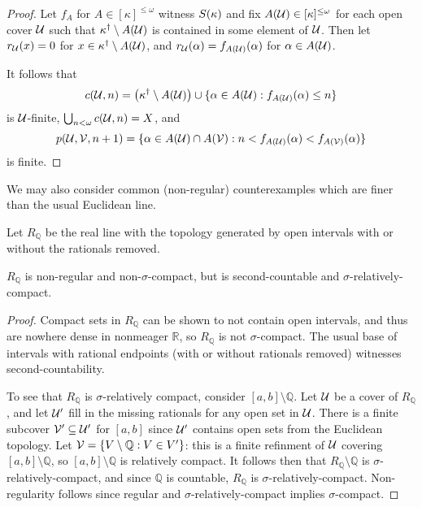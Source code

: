 \begin{proof}
  Let $f_A$ for $A\in[\kappa]^{\leq\omega}$ witness $S(\kappa)$ and fix
  $A(\mathcal{U})\in[\kappa]^{\leq\omega}$ for each open cover $\mathcal{U}$ such that
  $\kappa^\dagger\setminus A(\mathcal{U})$ is contained in some element of
  $\mathcal{U}$.
  Then let $r_{\mathcal{U}}(x)=0$ for $x\in\kappa^\dagger\setminus A(\mathcal{U})$,
  and $r_{\mathcal{U}}(\alpha)=f_{A(\mathcal{U})}(\alpha)$ for $\alpha\in A(\mathcal{U})$.

  It follows that
    \[
      c(\mathcal{U},n)
        =
      \left(\kappa^\dagger\setminus A(\mathcal{U})\right)
        \cup
      \{\alpha\in A(\mathcal{U}) : f_{A(\mathcal{U})}(\alpha)\leq n \}
    \]
  is $\mathcal{U}$-finite, $\bigcup_{n<\omega}c(\mathcal{U},n)=X$, and
    \[
      p(\mathcal{U},\mathcal{V},n+1)
        =
      \{
        \alpha\in A(\mathcal{U})\cap A(\mathcal{V})
          :
        n < f_{A(\mathcal{U})}(\alpha) < f_{A(\mathcal{V})}(\alpha)
      \}
    \]
  is finite.
\end{proof}

We may also consider common (non-regular) counterexamples which are finer
than the usual Euclidean line.

\begin{defn}
  Let $R_{\mathbb Q}$ be the real line with the topology generated by open
  intervals with or without the rationals removed.
\end{defn}

\begin{thm}
  $R_{\mathbb Q}$ is non-regular and non-$\sigma$-compact, but is
  second-countable and $\sigma$-relatively-compact.
\end{thm}

\begin{proof}
  Compact sets in $R_{\mathbb Q}$ can be shown to not contain open intervals,
  and thus are nowhere dense in nonmeager $\mathbb R$,
  so $R_{\mathbb Q}$ is not $\sigma$-compact. The usual base of
  intervals with rational endpoints (with or without rationals removed)
  witnesses second-countability.

  To see that $R_{\mathbb Q}$ is $\sigma$-relatively compact, consider
  $[a,b]\setminus\mathbb{Q}$. Let $\mathcal{U}$ be a cover of $R_{\mathbb Q}$, and
  let $\mathcal{U}'$ fill in the missing rationals for any open set in $\mathcal{U}$.
  There is a finite subcover $\mathcal{V}'\subseteq \mathcal{U}'$ for $[a,b]$ since
  $\mathcal{U}'$ contains open sets from the Euclidean topology. Let
  $\mathcal{V}= \{V\setminus\mathbb{Q}:V\in V'\}$: this is a finite refinment of
  $\mathcal{U}$ covering $[a,b]\setminus\mathbb{Q}$, so $[a,b]\setminus\mathbb{Q}$
  is relatively compact. It follows then that $R_{\mathbb Q}\setminus\mathbb Q$
  is $\sigma$-relatively-compact, and since $\mathbb Q$ is countable,
  $R_{\mathbb Q}$ is $\sigma$-relatively-compact. Non-regularity follows since
  regular and $\sigma$-relatively-compact implies $\sigma$-compact.
\end{proof}

